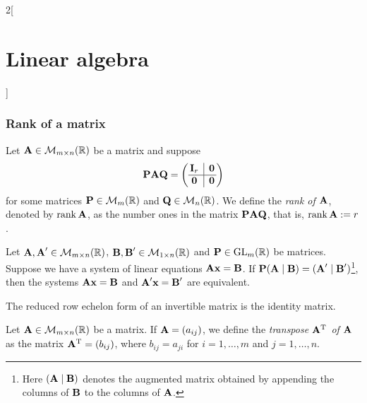 \documentclass[../../../main.tex]{subfiles}
\begin{document}
\begin{multicols}{2}[\section{Linear algebra}]
  \subsubsection{Rank of a matrix}
  \begin{definition}[Rank]
    Let $\boldsymbol{\mathrm{A}}\in\mathcal{M}_{m\times n}(\mathbb{R})$ be a matrix and suppose
    $$\vectorfunction{P}\vectorfunction{A}\vectorfunction{Q}=\left(
      \begin{array}{@{\,} c|c @{\,}}
          \vectorfunction{I}_r & \vectorfunction{0} \\
          \hline
          \vectorfunction{0}   & \vectorfunction{0}
        \end{array}
      \right)$$ for some matrices $\boldsymbol{\mathrm{P}}\in\mathcal{M}_m(\mathbb{R})$ and $\boldsymbol{\mathrm{Q}}\in\mathcal{M}_n(\mathbb{R})$. We define the \textit{rank of $\boldsymbol{\mathrm{A}}$}, denoted by $\rank \boldsymbol{\mathrm{A}}$, as the number ones in the matrix $\boldsymbol{\mathrm{P}}\boldsymbol{\mathrm{A}}\boldsymbol{\mathrm{Q}}$, that is, $\rank\boldsymbol{\mathrm{A}}:=r$.
  \end{definition}
  \begin{prop}
    Let $\boldsymbol{\mathrm{A}},\boldsymbol{\mathrm{A}}'\in\mathcal{M}_{m\times n}(\mathbb{R})$, $\boldsymbol{\mathrm{B}},\boldsymbol{\mathrm{B}}'\in\mathcal{M}_{1\times n}(\mathbb{R})$ and $\boldsymbol{\mathrm{P}}\in\mathrm{GL}_m(\mathbb{R})$ be matrices. Suppose we have a system of linear equations $\boldsymbol{\mathrm{A}}\boldsymbol{\mathrm{x}}=\boldsymbol{\mathrm{B}}$. If $\boldsymbol{\mathrm{P}}(\boldsymbol{\mathrm{A}}\mid\boldsymbol{\mathrm{B}})=(\boldsymbol{\mathrm{A}}'\mid\boldsymbol{\mathrm{B}}')$\footnote{Here $(\boldsymbol{\mathrm{A}}\mid\boldsymbol{\mathrm{B}})$ denotes the augmented matrix obtained by appending the columns of $\boldsymbol{\mathrm{B}}$ to the columns of $\boldsymbol{\mathrm{A}}$.}, then the systems $\boldsymbol{\mathrm{A}}\boldsymbol{\mathrm{x}}=\boldsymbol{\mathrm{B}}$ and $\boldsymbol{\mathrm{A}}'\boldsymbol{\mathrm{x}}=\boldsymbol{\mathrm{B}}'$ are equivalent.
  \end{prop}
  \begin{corollary}
    The reduced row echelon form of an invertible matrix is the identity matrix.
  \end{corollary}
  \begin{definition}[Transposition]
    Let $\boldsymbol{\mathrm{A}}\in\mathcal{M}_{m\times n}(\mathbb{R})$ be a matrix. If $\boldsymbol{\mathrm{A}}=(a_{ij})$, we define the \textit{transpose $\vb{A}^{\mathrm{T}}$ of $\boldsymbol{\mathrm{A}}$} as the matrix $\vb{A}^{\mathrm{T}}=(b_{ij})$, where $b_{ij}=a_{ji}$ for $i=1,\ldots,m$ and $j=1,\ldots,n$.
  \end{definition}

\end{multicols}
\end{document}
